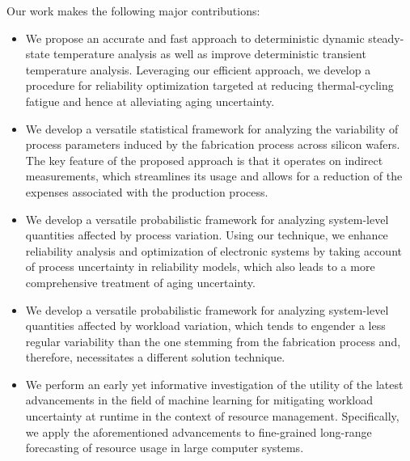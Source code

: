 Our work makes the following major contributions:

\begin{itemize}

\item
We propose an accurate and fast approach to deterministic dynamic steady-state
temperature analysis as well as improve deterministic transient temperature
analysis. Leveraging our efficient approach, we develop a procedure for
reliability optimization targeted at reducing thermal-cycling fatigue and hence
at alleviating aging uncertainty.

\item
We develop a versatile statistical framework for analyzing the variability of
process parameters induced by the fabrication process across silicon wafers. The
key feature of the proposed approach is that it operates on indirect
measurements, which streamlines its usage and allows for a reduction of the
expenses associated with the production process.

\item
We develop a versatile probabilistic framework for analyzing system-level
quantities affected by process variation. Using our technique, we enhance
reliability analysis and optimization of electronic systems by taking account of
process uncertainty in reliability models, which also leads to a more
comprehensive treatment of aging uncertainty.

\item
We develop a versatile probabilistic framework for analyzing system-level
quantities affected by workload variation, which tends to engender a less
regular variability than the one stemming from the fabrication process and,
therefore, necessitates a different solution technique.

\item
We perform an early yet informative investigation of the utility of the latest
advancements in the field of machine learning for mitigating workload
uncertainty at runtime in the context of resource management. Specifically, we
apply the aforementioned advancements to fine-grained long-range forecasting of
resource usage in large computer systems.

\end{itemize}
